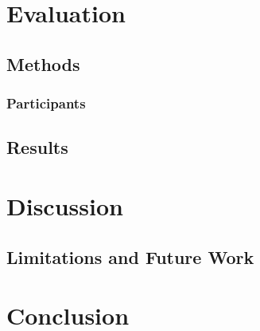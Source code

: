 \documentclass{vgtc}                          %
\begin{document}
\section{Evaluation}


\subsection{Methods}


\subsubsection{Participants}
\subsection{Results}

\section{Discussion}
\subsection{Limitations and Future Work}

\section{Conclusion}



%

%
%
%


\end{document}
